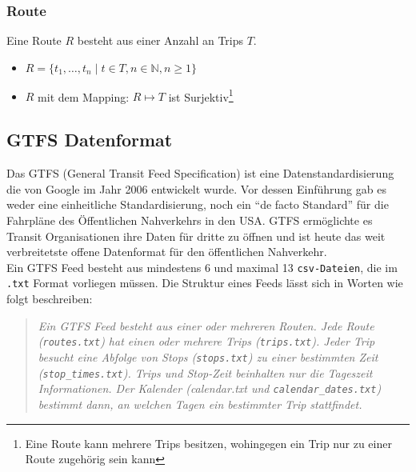 \begin{newpage}

    \subsubsection{Route}
    \label{ssub:route}
      Eine Route $R$ besteht aus einer Anzahl an Trips $T$.
      \begin{itemize}
        \item $R = \{ t_1, \dotsc, t_n \;|\; t \in T, n \in \mathbb{N}, n \geq 1 \}$
        \item $R$ mit dem Mapping: $R \mapsto T$ ist Surjektiv\footnote{Eine Route kann mehrere Trips besitzen, wohingegen ein Trip nur zu einer Route zugehörig sein kann} 
      \end{itemize}


	\subsection{GTFS Datenformat}
	\label{ssec:gtfs_datenformat}
		Das GTFS (General Transit Feed Specification) ist eine Datenstandardisierung die von Google im Jahr 2006 entwickelt wurde. Vor dessen Einführung gab es weder eine einheitliche Standardisierung, noch ein "`de facto Standard"' für die Fahrpläne des Öffentlichen Nahverkehrs in den USA. GTFS ermöglichte es Transit Organisationen ihre Daten für dritte zu öffnen und ist heute das weit verbreitetste offene Datenformat für den öffentlichen Nahverkehr.\parencite[S. 2]{roush}\\

    Ein GTFS Feed besteht aus mindestens 6 und maximal 13 \texttt{csv-Dateien}, die im \texttt{.txt} Format vorliegen müssen. Die Struktur eines Feeds lässt sich in Worten wie folgt beschreiben:

    \begin{quote}
      \textit{Ein GTFS Feed besteht aus einer oder mehreren Routen. Jede Route (\texttt{routes.txt}) hat einen oder mehrere Trips (\texttt{trips.txt}). Jeder Trip besucht eine Abfolge von Stops (\texttt{stops.txt}) zu einer bestimmten Zeit (\texttt{stop\_times.txt}). Trips und Stop-Zeit beinhalten nur die Tageszeit Informationen. Der Kalender (calendar.txt und \texttt{calendar\_dates.txt}) bestimmt dann, an welchen Tagen ein bestimmter Trip stattfindet.} \cite[S. 8]{zervaas}
    \end{quote}


\end{newpage}
